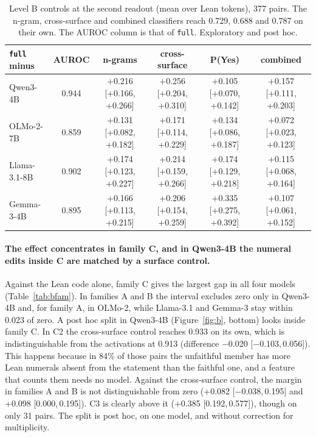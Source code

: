 \documentclass[10pt]{article}
\newcommand{\vr}[1]{\texttt{#1}}
\newcommand{\ic}[2]{[#1,\,#2]}
\begin{document}
\begin{table}[h]
\centering
\caption{Level B controls at the second readout (mean over Lean tokens), 377 pairs. The n-gram, cross-surface and combined classifiers reach 0.729, 0.688 and 0.787 on their own. The AUROC column is that of \vr{full}. Exploratory and post hoc.}
\label{tab:bcontroles2}
\vspace{2pt}
{\footnotesize\setlength{\tabcolsep}{2pt}
\begin{tabular}{@{}lccccc@{}}
\toprule
\vr{full} minus & AUROC & n-grams & cross-surface & P(Yes) & combined\\
\midrule
Qwen3-4B     & 0.944 & +0.216 [+0.166, +0.266] & +0.256 [+0.204, +0.310] & +0.105 [+0.070, +0.142] & +0.157 [+0.111, +0.203]\\
OLMo-2-7B    & 0.859 & +0.131 [+0.082, +0.182] & +0.171 [+0.114, +0.229] & +0.134 [+0.086, +0.187] & +0.072 [+0.023, +0.123]\\
Llama-3.1-8B & 0.902 & +0.174 [+0.123, +0.227] & +0.214 [+0.159, +0.266] & +0.174 [+0.129, +0.218] & +0.115 [+0.068, +0.164]\\
Gemma-3-4B   & 0.895 & +0.166 [+0.113, +0.215] & +0.206 [+0.154, +0.259] & +0.335 [+0.275, +0.392] & +0.107 [+0.061, +0.152]\\
\bottomrule
\end{tabular}}
\end{table}

\paragraph{The effect concentrates in family C, and in Qwen3-4B the numeral edits inside C are matched by a surface control.}
Against the Lean code alone, family C gives the largest gap in all four models (Table~\ref{tab:bfam}). In families A and
B the interval excludes zero only in Qwen3-4B and, for family A, in OLMo-2, while Llama-3.1 and Gemma-3 stay within
0.023 of zero. A post hoc split in Qwen3-4B (Figure~\ref{fig:b}, bottom) looks inside family C. In C2 the cross-surface
control reaches 0.933 on its own, which is indistinguishable from the activations at 0.913 (difference −0.020
\ic{−0.103}{0.056}). This happens because in 84\% of those pairs the unfaithful member has more Lean numerals
absent from the statement than the faithful one, and a feature that counts them needs no model. Against
the cross-surface control, the margin in families A and B is not distinguishable from zero (+0.082 \ic{−0.038}{0.195} and +0.098
\ic{0.000}{0.195}). C3 is clearly above it (+0.385 \ic{0.192}{0.577}), though on only 31 pairs. The split is
post hoc, on one model, and without correction for multiplicity.
\end{document}
